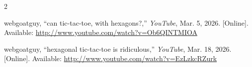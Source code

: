 \documentclass[conference]{IEEEtran}
\begin{document}
\begin{thebibliography}{2}

webgoatguy, ``can tic-tac-toe, with hexagons?,'' \textit{YouTube}, Mar. 5, 2026. [Online]. Available: \url{http://www.youtube.com/watch?v=Ob6QINTMIOA}

webgoatguy, ``hexagonal tic-tac-toe is ridiculous,'' \textit{YouTube}, Mar. 18, 2026. [Online]. Available: \url{http://www.youtube.com/watch?v=EzLzkcRZurk}

\end{thebibliography}
\end{document}
